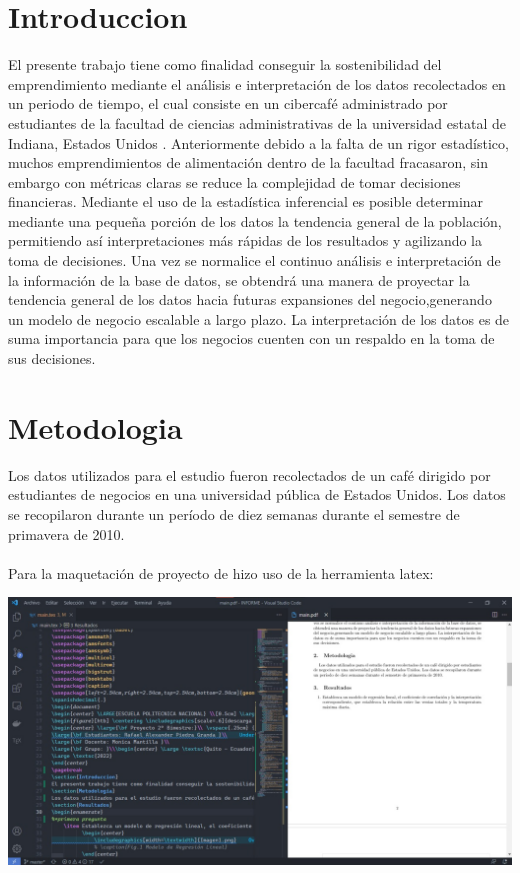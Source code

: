 \documentclass{article}
\begin{document}
\section{Introduccion}
El presente trabajo tiene como finalidad conseguir la sostenibilidad del emprendimiento mediante el análisis e interpretación de los datos recolectados en un periodo de tiempo, el cual consiste en un cibercafé administrado por estudiantes de la facultad de ciencias administrativas de la universidad estatal de Indiana, Estados Unidos . Anteriormente debido a la falta de un rigor estadístico, muchos emprendimientos de alimentación dentro de la facultad fracasaron, sin embargo con métricas claras se reduce la complejidad de tomar decisiones financieras. Mediante el uso de la estadística inferencial es posible determinar mediante una pequeña porción de los datos la tendencia general de la población, permitiendo así interpretaciones más rápidas de los resultados y agilizando la toma de decisiones. Una vez se normalice el continuo análisis e interpretación de la información de la  base de datos, se obtendrá una manera de proyectar la tendencia general de los datos hacia futuras expansiones del negocio,generando un modelo de negocio escalable a largo plazo. La interpretación de los datos es de suma importancia para que los negocios cuenten con un respaldo en la toma de sus decisiones. 
\section{Metodologia}
Los datos utilizados para el estudio fueron recolectados de un café dirigido por estudiantes de negocios en una universidad pública de Estados Unidos. Los datos se recopilaron durante un período de diez semanas durante el semestre de primavera de 2010.\\\\
Para la maquetación de proyecto de hizo uso de la herramienta latex:\\
\begin{center}
    \includegraphics[width=\textwidth]{WhatsApp Image 2022-02-28 at 1.07.56 AM.jpeg}
    
\end{center}
\end{document}
